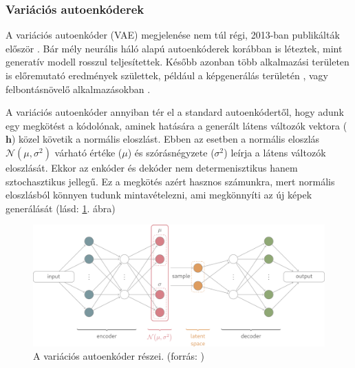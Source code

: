 \subsubsection{Variációs autoenkóderek}

A variációs autoenkóder (VAE) megjelenése nem túl régi, 2013-ban publikálták először \cite{kingma2013auto}. Bár mély neurális háló alapú autoenkóderek korábban is léteztek, mint generatív modell rosszul teljesítettek. Később azonban több alkalmazási területen is előremutató eredmények születtek, például a képgenerálás területén \cite{razavi2019generating}, vagy felbontásnövelő alkalmazásokban \cite{ledig2017photo}. 



A variációs autoenkóder annyiban tér el a standard autoenkódertől, hogy adunk egy megkötést a kódolónak, aminek hatására a generált látens változók vektora ($\textbf{h}$) közel követik a normális eloszlást. Ebben az esetben a normális eloszlás $\mathcal{N}(\mu,\sigma^2)$ várható értéke ($\mu$) és szórásnégyzete ($\sigma^2$) leírja a látens változók eloszlását. Ekkor az enkóder és dekóder nem determenisztikus hanem sztochasztikus jellegű. Ez a megkötés azért hasznos számunkra, mert normális eloszlásból könnyen tudunk mintavételezni, ami megkönnyíti az új képek generálását (lásd: \ref{fig:vae}. ábra)

\begin{figure}[ht]
	\centering
	\includegraphics[width=1\columnwidth]{figures/vae.png}
	\caption{A variációs autoenkóder részei. (forrás: \cite{fig:autoenc_struct})}
	\label{fig:vae}
\end{figure}

